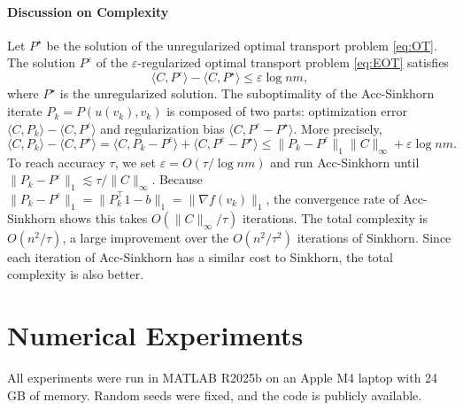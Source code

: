 \documentclass{article}
\theoremstyle{plain}
\theoremstyle{remark}
\begin{document}

\paragraph{Discussion on Complexity}
Let $P^\star$ be the solution of the unregularized optimal transport problem \eqref{eq:OT}. The solution $P^\varepsilon$ of the $\varepsilon$-regularized optimal transport problem \eqref{eq:EOT} satisfies  \cite{peyre2019computational}
$$\langle C,P^\varepsilon\rangle-\langle C,P^\star\rangle\le \varepsilon \log nm,$$ where $P^\star$ is the unregularized solution. The suboptimality of the Acc-Sinkhorn iterate $P_k=P(u(v_k),v_k)$ is composed of two parts: optimization error $\langle C,P_k\rangle-\langle C,P^\varepsilon\rangle$ and regularization bias $\langle C, P^\varepsilon-P^\star\rangle$. More precisely,
$$\langle C,P_k\rangle-\langle C,P^\star\rangle = \langle C,P_k-P^\varepsilon\rangle + \langle C, P^\varepsilon-P^\star\rangle \le \|P_k-P^\varepsilon\|_1\|C\|_\infty + \varepsilon \log nm.$$
To reach accuracy $\tau$, we set $\varepsilon=O(\tau/\log nm)$ and run Acc-Sinkhorn until $\|P_k-P^\varepsilon\|_1 \lesssim \tau/\|C\|_\infty$. Because $\|P_k-P^\varepsilon\|_1 = \|P_k^\top 1-b\|_1 = \|\nabla f(v_k)\|_1$, the convergence rate of Acc-Sinkhorn shows this takes $O(\|C\|_\infty/\tau)$ iterations. The total complexity is $O(n^2/\tau)$, a large improvement over the $O(n^2/\tau^2)$ iterations of Sinkhorn. Since each iteration of Acc-Sinkhorn has a similar cost to Sinkhorn, the total complexity is also better.


\section{Numerical Experiments}
All experiments were run in MATLAB R2025b on an Apple M4 laptop with 24 GB of memory. Random seeds were fixed, and the code is publicly available.
\end{document}

